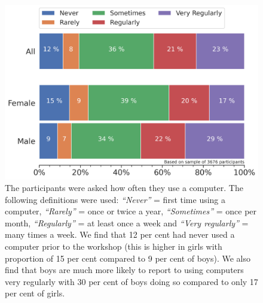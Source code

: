 \documentclass[12pt]{report} %
\begin{document}
\begin{figure}[t!]
    \centering
        \includegraphics[width=1\textwidth]{bar_UseComputersOften}
\caption{The participants were asked how often they use a computer. The following definitions were used:  \textit{``Never''} = first time using a computer,  \textit{``Rarely''} = once or twice a year, \textit{``Sometimes''} = once per month,  \textit{``Regularly''} = at least once a week and  \textit{``Very regularly''} = many times a week. We find that 12 per cent had never used a computer prior to the workshop (this is higher in girls with proportion of 15 per cent compared to 9 per cent of boys). We also find that boys are much more likely to report to using computers very regularly with 30 per cent of boys doing so compared to only 17 per cent of girls. } 
\label{fig:itusefreq}
\end{figure}
\end{document}
